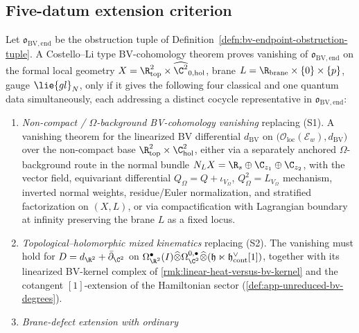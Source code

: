 \subsection*{Five-datum extension criterion}

\begin{thm}\label{thm:t4-four-missing}
  Let \(\mathfrak o_{\mathrm{BV,end}}\) be the obstruction tuple of
  Definition~\ref{defn:bv-endpoint-obstruction-tuple}.  A Costello--Li
  type BV-cohomology theorem proves vanishing of \(\mathfrak
  o_{\mathrm{BV,end}}\) on the formal local geometry
  \(X=\R^2_{\mathrm{top}}\times\widehat{\C^2}_{0,\mathrm{hol}}\), brane
  \(L=\R_{\mathrm{brane}}\times\{0\}\times\{p\}\), gauge \(\lie{gl}_N\),
	  only if it gives the following four classical and one
	  quantum data simultaneously, each addressing a distinct cocycle
  representative in
  \(\mathfrak o_{\mathrm{BV,end}}\):
  \begin{enumerate}
    \item[\emph{(I1)}] \emph{Non-compact / \(\Omega\)-background
      BV-cohomology vanishing} replacing (S1).  A vanishing theorem
	      for the linearized BV differential \(d_{\mathrm{BV}}\) on
	      \(\bigl(\mathcal O_{\mathrm{loc}}(\mathcal E_w),d_{\mathrm{BV}}\bigr)\)
      over the non-compact base
      \(\R^2_{\mathrm{top}}\times\C^2_{\mathrm{hol}}\), either via a
      separately anchored \(\Omega\)-background route in the normal
      bundle \(N_LX=\R_s\oplus\C_{z_1}\oplus\C_{z_2}\), with the
      vector field, equivariant differential
      \(Q_\Omega=Q+\iota_{V_\Omega}\), \(Q_\Omega^2=L_{V_\Omega}\)
      mechanism, inverted normal weights, residue/Euler normalization,
      and stratified factorization on \((X,L)\), or via
      compactification with Lagrangian boundary at infinity preserving
      the brane \(L\) as a fixed locus.
    \item[\emph{(I2)}] \emph{Topological--holomorphic mixed kinematics}
      replacing (S2).  The vanishing must hold for
      \(D=d_{\R^2}+\bar\partial_{\C^2}\) on
      \(\Omega^\bullet_{\R^2}(I)\widehat\otimes
        \Omega^{0,\bullet}_{\C^2}\widehat\otimes
        (\mathfrak h\ltimes\mathfrak h^\vee_{\mathrm{cont}}[1])\),
      together with its linearized BV-kernel complex of
      \ref{rmk:linear-heat-versus-bv-kernel} and the cotangent
      \([1]\)-extension of the Hamiltonian sector
      (\ref{def:app-unreduced-bv-degrees}).
    \item[\emph{(I3)}] \emph{Brane-defect extension with ordinary
}
\end{enumerate}
\end{thm}
